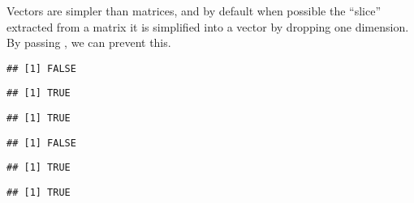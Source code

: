 \documentclass[krantz2]{krantz}\usepackage{knitr}
\begin{document}
\begin{explainbox}
Vectors are simpler than matrices, and by default when possible the ``slice'' extracted from a matrix it is simplified into a vector by dropping one dimension. By passing , we can prevent this.

\begin{knitrout}\footnotesize
{}\color{fgcolor}\begin{kframe}
\begin{alltt}
\hlstd{(A[}\hlstd{, ])}
\end{alltt}
\begin{verbatim}
## [1] FALSE
\end{verbatim}
\begin{alltt}
\hlstd{(A[}\hlopt{:}\hlstd{,} \hlopt{:}\hlstd{])}
\end{alltt}
\begin{verbatim}
## [1] TRUE
\end{verbatim}
\begin{alltt}
\hlstd{(A[}\hlstd{, ])}
\end{alltt}
\begin{verbatim}
## [1] TRUE
\end{verbatim}
\begin{alltt}
\hlstd{(A[}\hlopt{:}\hlstd{,} \hlopt{:}\hlstd{])}
\end{alltt}
\begin{verbatim}
## [1] FALSE
\end{verbatim}
\begin{alltt}
\hlstd{(A[}\hlstd{, ,}  \hlstd{=} \hlstd{])}
\end{alltt}
\begin{verbatim}
## [1] TRUE
\end{verbatim}
\begin{alltt}
\hlstd{(A[}\hlopt{:}\hlstd{,} \hlopt{:}\hlstd{,}  \hlstd{=} \hlstd{])}
\end{alltt}
\begin{verbatim}
## [1] TRUE
\end{verbatim}
\end{kframe}
\end{knitrout}

\end{explainbox}
\end{document}
